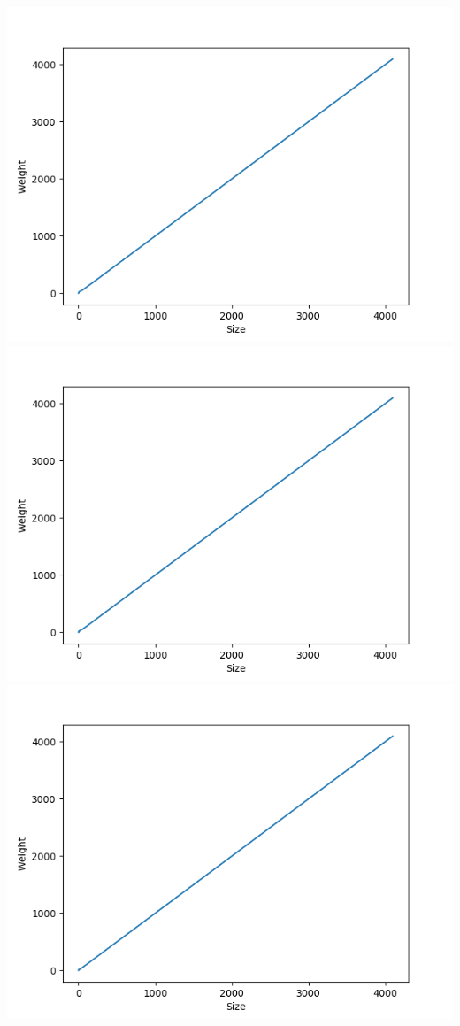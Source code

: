 \documentclass[]{article}
\begin{document}
\includegraphics[scale=0.5]{krusk_Weight_p=04.png}\\
\includegraphics[scale=0.5]{krusk_Weight_p=06.png}
\includegraphics[scale=0.5]{krusk_Weight_p=08.png}
\end{document}
